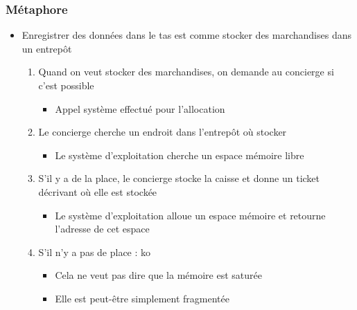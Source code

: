 \begin{frame}
\frametitle{Métaphore}
\begin{itemize}[<+->]
\item Enregistrer des données dans le tas est comme stocker des marchandises dans un entrepôt
	\begin{enumerate}
	\item Quand on veut stocker des marchandises, on demande au concierge si c'est possible
		\begin{itemize}
		\item Appel système effectué pour l'allocation
		\end{itemize}
	\item Le concierge cherche un endroit dans l'entrepôt où stocker
		\begin{itemize}
		\item Le système d'exploitation cherche un espace mémoire libre
		\end{itemize}
	\item S'il y a de la place, le concierge stocke la caisse et donne un ticket décrivant où elle est stockée
		\begin{itemize}
		\item Le système d'exploitation alloue un espace mémoire et retourne l'adresse de cet espace
		\end{itemize}
	\item S'il n'y a pas de place : ko
		\begin{itemize}
		\item Cela ne veut pas dire que la mémoire est saturée
		\item Elle est peut-être simplement fragmentée
		\end{itemize}
	\end{enumerate}
\end{itemize}
\end{frame}

